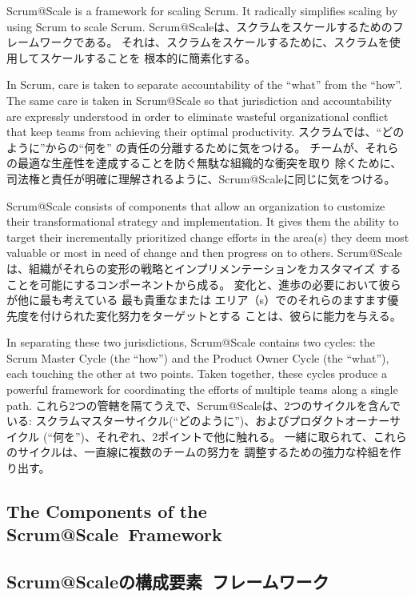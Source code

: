\documentclass[12pt,a4paper,parskip=full]{scrartcl}
\begin{document}
Scrum@Scale is a framework for scaling Scrum. It radically simplifies
scaling by using Scrum to scale Scrum. 
\fi
Scrum@Scaleは、スクラムをスケールするためのフレームワークである。
それは、スクラムをスケールするために、スクラムを使用してスケールすることを
根本的に簡素化する。

In Scrum, care is taken to separate accountability of the ``what'' from the
``how''. The same care is taken in Scrum@Scale so that jurisdiction and
accountability are expressly understood in order to eliminate wasteful
organizational conflict that keep teams from achieving their optimal
productivity.
\fi
スクラムでは、``どのように''からの``何を'' の責任の分離するために気をつける。
チームが、それらの最適な生産性を達成することを防ぐ無駄な組織的な衝突を取り
除くために、司法権と責任が明確に理解されるように、Scrum@Scaleに同じに気をつける。

Scrum@Scale consists of components that allow an organization to
customize their transformational strategy and implementation. It gives them
the ability to target their incrementally prioritized change efforts in the area(s) they deem
most valuable or most in need of change and then progress on to others.
\fi
Scrum@Scaleは、組織がそれらの変形の戦略とインプリメンテーションをカスタマイズ
することを可能にするコンポーネントから成る。
変化と、進歩の必要において彼らが他に最も考えている 最も貴重なまたは
エリア（s）でのそれらのますます優先度を付けられた変化努力をターゲットとする
ことは、彼らに能力を与える。

In separating these two jurisdictions, Scrum@Scale contains two cycles: the
Scrum Master Cycle (the ``how'') and the Product Owner Cycle (the
``what''), each touching the other at two points. Taken together, these
cycles produce a powerful framework for coordinating the efforts of
multiple teams along a single path.
\fi
これら2つの管轄を隔てうえで、Scrum@Scaleは、2つのサイクルを含んでいる:
スクラムマスターサイクル(``どのように'')、およびプロダクトオーナーサイクル
(``何を'')、それぞれ、2ポイントで他に触れる。
一緒に取られて、これらのサイクルは、一直線に複数のチームの努力を
調整するための強力な枠組を作り出す。

\subsection{The Components of the Scrum@Scale\textregistered ~Framework}
\fi
\subsection{Scrum@Scaleの構成要素\textregistered ~フレームワーク}
\end{document}
